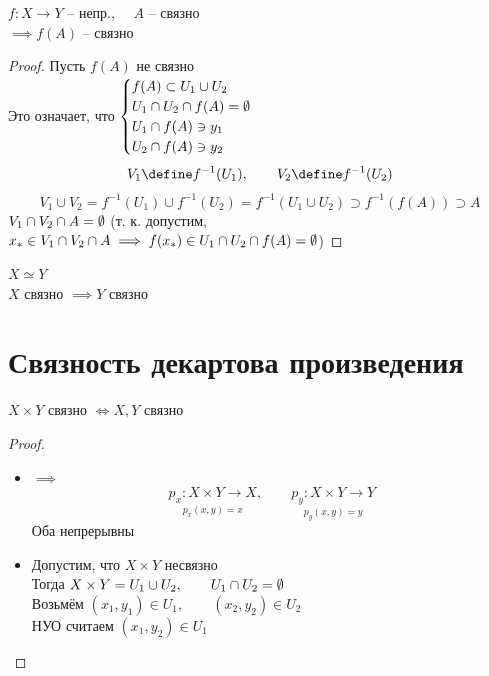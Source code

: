 \begin{theorem}
	$ f : X \to Y $ -- непр., $ \quad A $ -- связно \\
	$ \implies f(A) $ -- связно
\end{theorem}

\begin{proof}
	Пусть $ f(A) $ не связно \\
	Это означает, что $
	\begin{cases}
		f(A) \subset U_1 \cup U_2 \\
		U_1 \cap U_2 \cap f(A) = \emptyset \\
		U_1 \cap f(A) \ni y_1 \\
		U_2 \cap f(A) \ni y_2
	\end{cases} $
	$$ V_1 \define f^{-1}(U_1), \qquad V_2 \define f^{-1}(U_2) $$
	$$ V_1 \cup V_2 = f^{-1}(U_1) \cup f^{-1}(U_2) = f^{-1}(U_1 \cup U_2) \supset f^{-1}(f(A)) \supset A $$
	$ V_1 \cap V_2 \cap A = \emptyset $ (т. к. допустим, $ x_* \in V_1 \cap V_2 \cap A \implies f(x_*) \in U_1 \cap U_2 \cap f(A) = \emptyset $)
\end{proof}

\begin{implication}
	$ X \simeq Y $ \\
	$ X $ связно $ \implies Y $ связно
\end{implication}

\section{Связность декартова произведения}

\begin{theorem}
	$ X \times Y $ связно $ \iff X, Y $ связно
\end{theorem}

\begin{proof}
	\hfill
	\begin{itemize}
		\item $ \implies $
		$$ \underset{p_x(x, y) = x}{p_x : X \times Y \to X}, \qquad \underset{p_y(x, y) = y}{p_y : X \times Y \to Y} $$
		Оба непрерывны
		\item Допустим, что $ X \times Y $ несвязно \\
		Тогда $ X \times Y = U_1 \cup U_2, \qquad U_1 \cap U_2 = \emptyset $ \\
		Возьмём $ (x_1, y_1) \in U_1, \qquad (x_2, y_2) \in U_2 $ \\
		НУО считаем $ (x_1, y_2) \in U_1 $
	\end{itemize}

\end{proof}

